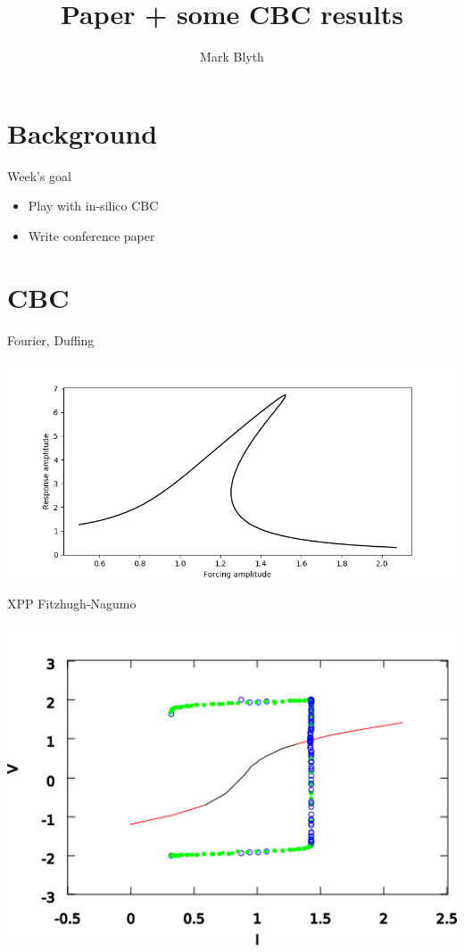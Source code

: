 \documentclass[presentation]{beamer}
\author{Mark Blyth}
\date{}
\title{Paper + some CBC results}
\begin{document}
\maketitle

\section{Background}
\label{sec:org69f5c53}
\begin{frame}[label={sec:org2244324}]{Week's goal}
\begin{itemize}
\item Play with in-silico CBC
\item Write conference paper
\end{itemize}
\end{frame}
\section{CBC}
\label{sec:orgd99d698}
\begin{frame}[label={sec:org7f8ef3b}]{Fourier, Duffing}
\begin{center}
\includegraphics[width=.9\linewidth]{./success.png}
\end{center}
\end{frame}

\begin{frame}[plain,label={sec:org860df28}]{XPP Fitzhugh-Nagumo}
\begin{center}
\includegraphics[width=.9\linewidth]{./fh_bifurcation.png}
\end{center}
\end{frame}
\end{document}

